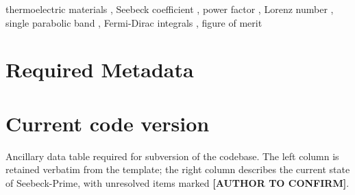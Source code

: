 \documentclass[preprint,12pt, a4paper]{elsarticle}
\begin{document}
\begin{frontmatter}

\begin{keyword}
thermoelectric materials \sep
Seebeck coefficient \sep
power factor \sep
Lorenz number \sep
single parabolic band \sep
Fermi-Dirac integrals \sep
figure of merit
\end{keyword}

\end{frontmatter}


\section*{Required Metadata}
\label{}

\section*{Current code version}
\label{}

Ancillary data table required for subversion of the codebase. The left column
is retained verbatim from the template; the right column describes the current
state of Seebeck-Prime, with unresolved items marked \textbf{[AUTHOR TO
CONFIRM]}.
\end{document}

